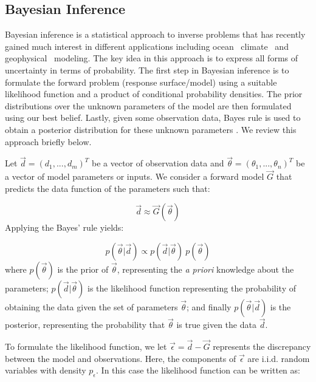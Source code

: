 \subsection{Bayesian Inference}
 \label{sec:inference}
 
Bayesian inference is a statistical approach to inverse problems
that has recently gained much interest in different applications including
ocean~\citep{Alexanderian2011a,Zedler2012,sraj:2013a}
climate~\citep{OlsonEtAl2012} and geophysical~\citep{Malinverno2002} modeling.
The key idea in this approach is to express all forms of uncertainty
in terms of probability. The first step in Bayesian inference 
is to formulate the forward problem (response surface/model) using 
a suitable likelihood function and a product of conditional probability densities. 
The prior distributions over the unknown parameters of the model
are then formulated using our best belief. Lastly, given some observation data, Bayes rule 
is used to obtain a posterior distribution for these unknown parameters
\citep{sivia}. We review this approach briefly below.

Let $\vec{d}=(d_1,...,d_m)^T$ be a vector of observation data and $\vec{\theta}=(\theta_1,...,\theta_n)^T$ be a vector of model parameters or inputs. We consider a forward model $\vec G$ that predicts the data function of 
the parameters such that:

\begin{equation}
\vec d \approx \vec{G}( \vec \theta)
\end{equation}
Applying the Bayes' rule yields:

\begin{equation}
 p(\vec{\theta}| \vec d) \propto 
 p(\vec d | \vec{\theta}) \ p(\vec{\theta})  
\label{eq:bayes}
\end{equation}
where $p(\vec{\theta})$ is the prior of $\vec{\theta}$, representing the \emph{a priori} knowledge
about the parameters; 
$p(\vec d| \vec{\theta})$ is the likelihood function representing
the probability of obtaining the data given the set of parameters $\vec{\theta}$;
and finally $p(\vec{\theta}| \vec d)$ is the posterior,
representing the probability that $\vec{\theta}$ is true given the data $\vec d $.

To formulate the likelihood function, we let $\vec \epsilon = \vec d - \vec{G}$
represents the discrepancy between the model and observations.
Here, the components of $\vec \epsilon $ are i.i.d. random variables with density $p_{\epsilon}$.
In this case the likelihood function can be written as:

